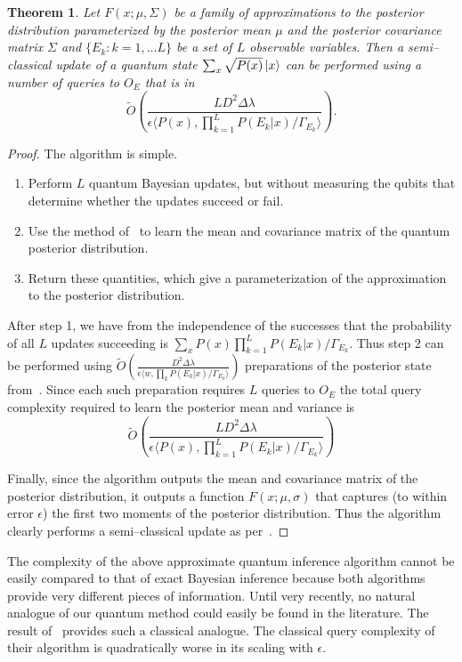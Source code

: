 \documentclass[aps,amsmath,onecolumn,amssymb,notitlepage]{revtex4-1}
\newtheorem{theorem}{Theorem}
\begin{document}
\begin{theorem}
Let $F(x;\mu, \Sigma)$ be a family of approximations to the posterior distribution parameterized by the posterior mean $\mu$ and the posterior covariance matrix $\Sigma$ and $\{E_k: k=1,\ldots L\}$ be a set of $L$ observable variables.  Then a semi--classical update of a quantum state $\sum_x \sqrt{P(x)} \left|x\right\rangle$ can be performed using a number of queries to $O_E$ that is in
$$
\tilde{O} \left(\frac{LD^2 \Delta  \lambda}{\epsilon \langle  P(x), \prod_{k=1}^LP(E_k|x)/\Gamma_{E_k}\rangle} \right).
$$
\end{theorem}
\begin{proof}
The algorithm is simple.  
\begin{enumerate}
\item Perform $L$ quantum Bayesian updates, but without measuring the qubits that determine whether the updates succeed or fail.
\item Use the method of~ to learn the mean and covariance matrix of the quantum posterior distribution.
\item Return these quantities, which give a parameterization of the approximation to the posterior distribution.
\end{enumerate}

After step 1, we have from the independence of the successes that the probability of all $L$ updates succeeding is $\sum_x P(x) \prod_{k=1}^L P(E_k|x)/\Gamma_{E_k}$.  Thus step 2 can be performed using $\tilde{O}\left(\frac{D^2\Delta \lambda}{\epsilon \langle w, \prod_k P(E_k|x)/\Gamma_{E_k}\rangle}\right)$ preparations of the posterior state from~.  Since each such preparation requires $L$ queries to $O_E$ the total query complexity required to learn the posterior mean and variance is
\begin{equation}
\tilde{O} \left(\frac{LD^2 \Delta \lambda }{\epsilon \langle  P(x), \prod_{k=1}^LP(E_k|x)/\Gamma_{E_k}\rangle} \right)
\end{equation}

Finally, since the algorithm outputs the mean and covariance matrix of the posterior distribution, it outputs a function $F(x;\mu,\sigma)$ that captures (to within error $\epsilon$) the first two moments of the posterior distribution.  Thus the algorithm clearly performs a semi--classical update as per~.
\end{proof}

The complexity of the above approximate quantum inference algorithm cannot be easily compared to that of exact Bayesian inference because both algorithms
provide very different pieces of information.  Until very recently,
no natural analogue of our quantum method could easily be found in the literature.  The result of~\cite{wiebe2015bayesian} provides such a classical analogue.  The classical query complexity of their algorithm is quadratically worse in its scaling with $\epsilon$.
\end{document}
